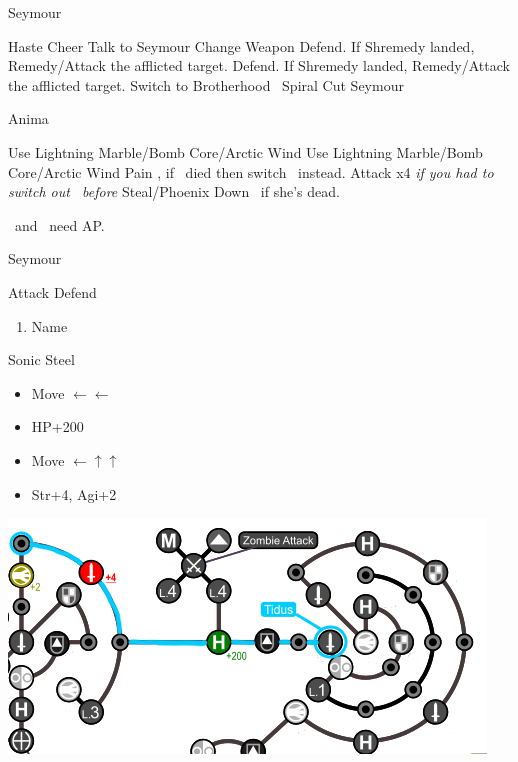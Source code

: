 \begin{battle}[3000]{Seymour}
  \begin{itemize}
  \tidusf Haste \tidus
  \tidusf Cheer
  \tidusf Talk to Seymour
  \yunaf Change Weapon
  \switch{\kimahri}{\rikku}
  \rikkuf Defend. If Shremedy landed, Remedy/Attack the afflicted target.
  \switch{\yuna}{\kimahri}
  \kimahrif Defend. If Shremedy landed, Remedy/Attack the afflicted target.
  \tidusf Switch to Brotherhood
    \tidusf \od\ Spiral Cut Seymour
  \end{itemize}
\end{battle}
\vfill
\begin{battle}[18000]{Anima}
\begin{itemize}
  \rikkuf Use Lightning Marble/Bomb Core/Arctic Wind
  \switch{\tidus}{\wakka}
  \kimahrif Use Lightning Marble/Bomb Core/Arctic Wind
  \enemyf Pain
  \switch{\wakka}{\tidus}, if \wakka\ died then switch \rikku\ instead.
  \tidusf Attack x4
  \switch{\kimahri}{\rikku} \textit{if you had to switch out \rikku\ before}
  \rikkuf Steal/Phoenix Down \yuna\ if she's dead.
  \end{itemize}
 \tidus\ and \yuna\ need AP.
\end{battle}
\begin{battle}[6000]{Seymour}
  \begin{itemize}
    \tidusf Attack
    \rikkuf Defend
    \end{itemize}
\end{battle}
\begin{enumerate}[resume]
  \item Name \shiva
\end{enumerate}
\begin{equip}
\begin{itemize}
\tidusf Sonic Steel
\end{itemize}
\end{equip}
\begin{spheregrid}
  \begin{itemize}
    \tidusf
    \begin{itemize}
      \item Move $\leftarrow\leftarrow$
      \item HP+200
      \item Move $\leftarrow\uparrow\uparrow$
      \item Str+4, Agi+2
    \end{itemize}
    \includegraphics[width=.8\columnwidth]{graphics/Tidus_Post_Seymour}
  \end{itemize}
\end{spheregrid}

